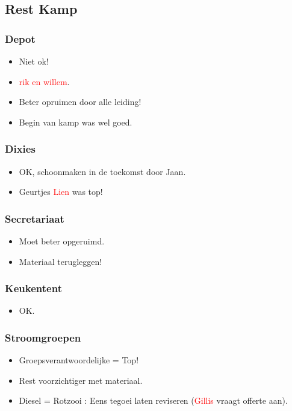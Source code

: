 \documentclass[pdftex,12pt,a4paper,english,titlepage]{article}
\begin{document}
\subsection{Rest Kamp}

\subsubsection{Depot}
\begin{itemize}
	\item Niet ok!
	\item \textcolor{red}{rik en willem}.
	\item Beter opruimen door alle leiding!
	\item Begin van kamp was wel goed.
\end{itemize}

\subsubsection{Dixies}
\begin{itemize}
	\item OK, schoonmaken in de toekomst door Jaan.
	\item Geurtjes \textcolor{red}{Lien} was top!
\end{itemize}

\subsubsection{Secretariaat}
\begin{itemize}
	\item Moet beter opgeruimd.
	\item Materiaal terugleggen!
\end{itemize}

\subsubsection{Keukentent}
\begin{itemize}
	\item OK.
\end{itemize}

\subsubsection{Stroomgroepen}
\begin{itemize}
	\item Groepsverantwoordelijke = Top!
	\item Rest voorzichtiger met materiaal.
	\item Diesel = Rotzooi : Eens tegoei laten reviseren (\textcolor{red}{Gillis} vraagt offerte aan).
\end{itemize}
\end{document}
